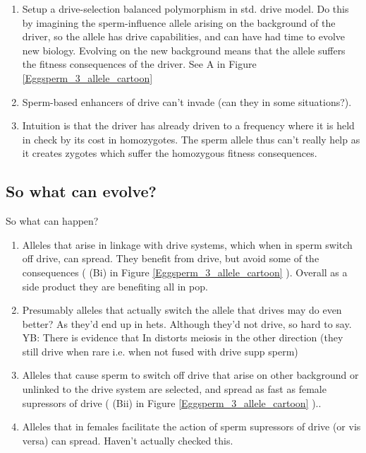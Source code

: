 \documentclass[12pt,letterpaper]{article}
\begin{document}
\begin{enumerate}
\item Setup a drive-selection balanced polymorphism in std. drive model. 
Do this by imagining the sperm-influence allele arising on the background of the driver, 
so the allele has drive capabilities, and can have had time to evolve new biology. 
Evolving on the new background means that the allele suffers the fitness consequences of the 
driver.  See A in Figure \ref{Eggsperm_3_allele_cartoon} \\
\item Sperm-based enhancers of drive can't invade (can they in some situations?). \\
\item Intuition is that the driver has already driven to a frequency 
where it is held in check by its cost in homozygotes. The sperm allele 
thus can't really help as it creates zygotes which suffer the homozygous fitness consequences.
\end{enumerate}

\subsection{So what can evolve?}
So what can happen?
\begin{enumerate}
\item Alleles that arise in linkage with drive systems, which when in sperm switch off drive, 
can spread. They benefit from drive, but avoid some of the
consequences ( (Bi) in Figure \ref{Eggsperm_3_allele_cartoon} ). Overall as a side product they are benefiting all in pop.\\
\item Presumably alleles that actually switch the allele that drives may do even better? As they'd end up in 
hets. Although they'd not drive, so hard to say. YB: There is evidence that In distorts meiosis in the other direction (they still drive when rare i.e. when not fused with drive supp sperm) \\
\item Alleles that cause sperm to switch off drive that arise on other background or unlinked to the drive system
are selected, and spread as fast as female supressors of drive ( (Bii) in Figure \ref{Eggsperm_3_allele_cartoon} )..\\
\item Alleles that in females facilitate the action of sperm supressors of drive (or vis versa) can spread. Haven't actually checked this.\\
\end{enumerate}
\end{document}
